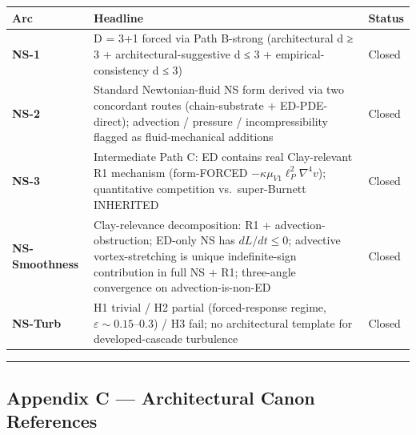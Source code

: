 \documentclass[
]{article}
\newcounter{none} %
\begin{document}
{\def\LTcaptype{none} %
\begin{longtable}[]{@{}
  >{\raggedright\arraybackslash}p{}
  >{\raggedright\arraybackslash}p{}
  >{\raggedright\arraybackslash}p{}@{}}
\toprule\noalign{}
\begin{minipage}[b]{\linewidth}\raggedright
Arc
\end{minipage} & \begin{minipage}[b]{\linewidth}\raggedright
Headline
\end{minipage} & \begin{minipage}[b]{\linewidth}\raggedright
Status
\end{minipage} \\
\midrule\noalign{}
\endhead
\bottomrule\noalign{}
\endlastfoot
\textbf{NS-1} & D = 3+1 forced via Path B-strong (architectural d ≥ 3 +
architectural-suggestive d ≤ 3 + empirical-consistency d ≤ 3) &
Closed \\
\textbf{NS-2} & Standard Newtonian-fluid NS form derived via two
concordant routes (chain-substrate + ED-PDE-direct); advection /
pressure / incompressibility flagged as fluid-mechanical additions &
Closed \\
\textbf{NS-3} & Intermediate Path C: ED contains real Clay-relevant R1
mechanism (form-FORCED \(-\kappa\mu_{V1}\ell_P^2\nabla^4 v\));
quantitative competition vs.~super-Burnett INHERITED & Closed \\
\textbf{NS-Smoothness} & Clay-relevance decomposition: R1 +
advection-obstruction; ED-only NS has \(dL/dt \le 0\); advective
vortex-stretching is unique indefinite-sign contribution in full NS +
R1; three-angle convergence on advection-is-non-ED & Closed \\
\textbf{NS-Turb} & H1 trivial / H2 partial (forced-response regime,
\(\varepsilon \sim 0.15\)--\(0.3\)) / H3 fail; no architectural template
for developed-cascade turbulence & Closed \\
\end{longtable}
}

\begin{center}\rule{0.5\linewidth}{0.5pt}\end{center}

\subsection{Appendix C --- Architectural Canon
References}\label{appendix-c-architectural-canon-references}
\end{document}
